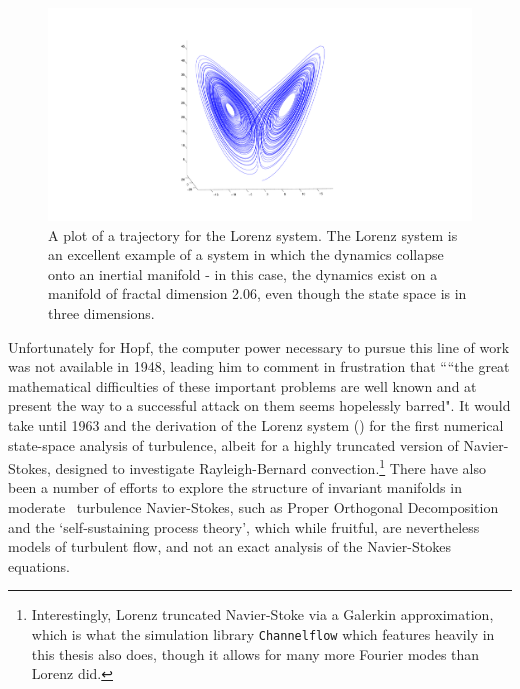 \begin{figure}[h]
\centerline{
\includegraphics[scale=0.5	]{Figs/LorenzAttractor}}
\caption[A plot of a trajectory for the Lorenz system.]{A plot of a trajectory for the Lorenz system. The Lorenz system is an excellent example of a system in which the dynamics collapse onto an inertial manifold - in this case, the dynamics exist on a manifold of fractal dimension 2.06, even though the state space is in three dimensions. }\label{fig:LorenzAttractor}
\end{figure}

Unfortunately for Hopf, the computer power necessary to pursue this line of work was not available in 1948, leading him to comment in frustration that ``“the great mathematical difficulties of these important problems are well
known and at present the way to a successful attack on them seems hopelessly
barred". It would take until 1963 and the derivation of the Lorenz system () for the first numerical state-space analysis of turbulence, albeit for a highly truncated version of Navier-Stokes, designed to investigate Rayleigh-Bernard convection.\footnote{Interestingly, Lorenz truncated Navier-Stoke via a Galerkin approximation, which is what the simulation library {\tt Channelflow} which features heavily in this thesis also does, though it allows for many more Fourier modes than Lorenz did.} There have also been a number of efforts to explore the structure of invariant manifolds in moderate \ReN\ turbulence Navier-Stokes, such as Proper Orthogonal Decomposition and the `self-sustaining process theory', which while fruitful, are nevertheless models of turbulent flow, and not an exact analysis of the Navier-Stokes equations.\\


